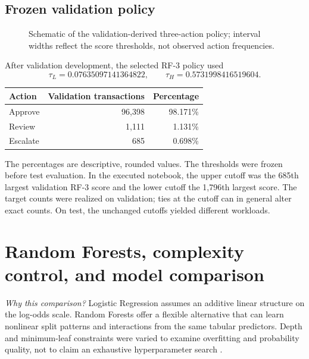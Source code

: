 \documentclass[11pt,a4paper]{article}
\begin{document}
\subsection{Frozen validation policy}
\begin{figure}[H]\centering
{}
\caption{Schematic of the validation-derived three-action policy; interval widths reflect the score thresholds, not observed action frequencies.}\label{fig:policy-bands}\end{figure}

After validation development, the selected RF-3 policy used
\begin{equation}\tau_L=0.07635097141364822,\qquad\tau_H=0.5731998416519604.\end{equation}
\begin{center}\begin{tabular}{lrr}\toprule Action & Validation transactions & Percentage \\\midrule Approve&96,398&98.171\%\\Review&1,111&1.131\%\\Escalate&685&0.698\%\\\bottomrule\end{tabular}\end{center}
The percentages are descriptive, rounded values. The thresholds were frozen before test evaluation. In the executed notebook, the upper cutoff was the 685th largest validation RF-3 score and the lower cutoff the 1,796th largest score. The target counts were realized on validation; ties at the cutoff can in general alter exact counts. On test, the unchanged cutoffs yielded different workloads.

\section{Random Forests, complexity control, and model comparison}
\noindent\textit{Why this comparison?} Logistic Regression assumes an
additive linear structure on the log-odds scale. Random Forests
offer a flexible alternative that can learn nonlinear split
patterns and interactions from the same tabular predictors.
Depth and minimum-leaf constraints were varied to examine
overfitting and probability quality, not to claim an exhaustive
hyperparameter search \cite{breiman2001,hastie2009}.
\end{document}

